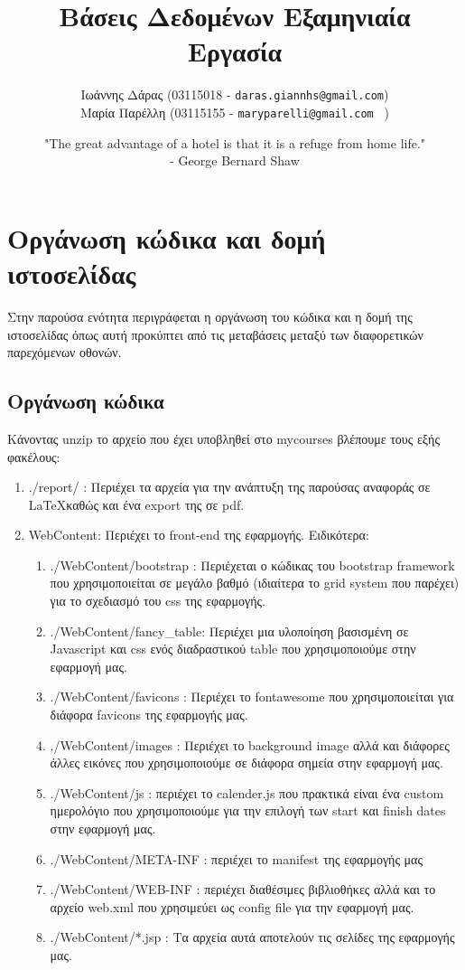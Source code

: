 \documentclass[a4paper,oneside, 11pt]{article}
\title{\textbf{Bάσεις Δεδομένων Εξαμηνιαία Εργασία}}
\author{ Ιωάννης Δάρας (03115018 - \texttt{daras.giannhs@gmail.com}) \\ 
Μαρία Παρέλλη (03115155 - \texttt{maryparelli@gmail.com } ) }
\date{"The great advantage of a hotel is that it is a refuge from home life." \\
- George Bernard Shaw}
\begin{document}
\maketitle

\section{Οργάνωση κώδικα και δομή ιστοσελίδας}
Στην παρούσα ενότητα περιγράφεται η οργάνωση του κώδικα και η δομή της ιστοσελίδας όπως αυτή προκύπτει από τις μεταβάσεις μεταξύ των διαφορετικών παρεχόμενων οθονών.
\subsection{Οργάνωση κώδικα}
Κάνοντας unzip το αρχείο που έχει υποβληθεί στο mycourses βλέπουμε τους εξής φακέλους:
\begin{enumerate}
\item ./report/ : Περιέχει τα αρχεία για την ανάπτυξη της παρούσας αναφοράς σε \LaTeX καθώς και ένα export της σε pdf.
\item WebContent: Περιέχει το front-end της εφαρμογής. Ειδικότερα:
\begin{enumerate}
\item ./WebContent/bootstrap : Περιέχεται ο κώδικας του bootstrap framework που χρησιμοποιείται σε μεγάλο βαθμό (ιδιαίτερα το grid system που παρέχει) για το σχεδιασμό του css της εφαρμογής.
\item ./WebContent/fancy\_table: Περιέχει μια υλοποίηση βασισμένη σε Javascript και css ενός διαδραστικού table που χρησιμοποιούμε στην εφαρμογή μας.
\item ./WebContent/favicons : Περιέχει το fontawesome που χρησιμοποιείται για διάφορα favicons της εφαρμογής μας.
\item ./WebContent/images : Περιέχει το background image αλλά και διάφορες άλλες εικόνες που χρησιμοποιούμε σε διάφορα σημεία στην εφαρμογή μας.
\item ./WebContent/js : περιέχει το calender.js που πρακτικά είναι ένα custom ημερολόγιο που χρησιμοποιούμε για την επιλογή των start και finish dates στην εφαρμογή μας.
\item ./WebContent/META-INF : περιέχει το manifest της εφαρμογής μας
\item ./WebContent/WEB-INF : περιέχει διαθέσιμες βιβλιοθήκες αλλά και το αρχείο web.xml που χρησιμεύει ως config file για την εφαρμογή μας.
\item ./WebContent/*.jsp : Τα αρχεία αυτά αποτελούν τις σελίδες της εφαρμογής μας.

\end{enumerate}
\end{enumerate}
\end{document}
